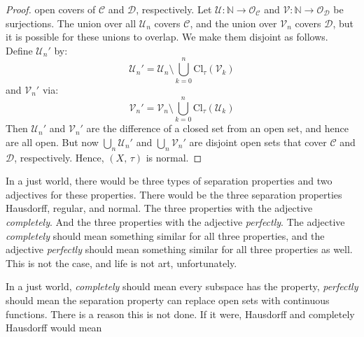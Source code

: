\documentclass{article}
\theoremstyle{plain}
\theoremstyle{normal}
\begin{document}
\begin{proof}
            open covers of $\mathcal{C}$ and $\mathcal{D}$, respectively.
            Let $\mathcal{U}:\mathbb{N}\rightarrow\mathcal{O}_{\mathcal{C}}$
            and $\mathcal{V}:\mathbb{N}\rightarrow\mathcal{O}_{\mathcal{D}}$ be
            surjections. The union over all $\mathcal{U}_{n}$ covers
            $\mathcal{C}$, and the union over $\mathcal{V}_{n}$ covers
            $\mathcal{D}$, but it is possible for these unions to overlap.
            We make them disjoint as follows.
            Define $\mathcal{U}_{n}'$ by:
            \begin{equation}
                \mathcal{U}_{n}'
                =\mathcal{U}_{n}
                \setminus\bigcup_{k=0}^{n}\textrm{Cl}_{\tau}(\mathcal{V}_{k})
            \end{equation}
            and $\mathcal{V}_{n}'$ via:
            \begin{equation}
                \mathcal{V}_{n}'
                =\mathcal{V}_{n}
                \setminus\bigcup_{k=0}^{n}\textrm{Cl}_{\tau}(\mathcal{U}_{k})
            \end{equation}
            Then $\mathcal{U}_{n}'$ and $\mathcal{V}_{n}'$ are the difference
            of a closed set from an open set, and hence are all open.
            But now $\bigcup_{n}\mathcal{U}_{n}'$ and
            $\bigcup_{n}\mathcal{V}_{n}'$ are disjoint open sets that cover
            $\mathcal{C}$ and $\mathcal{D}$, respectively. Hence,
            $(X,\,\tau)$ is normal.
        \end{proof}
        In a just world, there would be three types of separation properties
        and two adjectives for these properties. There would be the
        three separation properties Hausdorff, regular, and normal.
        The three properties with the adjective \textit{completely}. And the
        three properties with the adjective \textit{perfectly}. The adjective
        \textit{completely} should mean something similar for all three
        properties, and the adjective \textit{perfectly} should mean something
        similar for all three properties as well. This is not the case, and
        life is not art, unfortunately.
        \par\hfill\par
        In a just world, \textit{completely} should mean every subspace has
        the property, \textit{perfectly} should mean the separation property
        can replace open sets with continuous functions. There is a reason this
        is not done. If it were, Hausdorff and completely Hausdorff would mean
\end{document}
